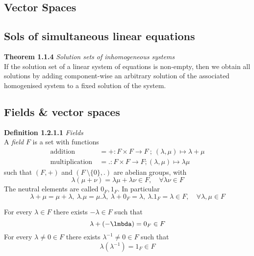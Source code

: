 \documentclass[8pt,landscape]{article}
\begin{document}
\begin{multicols}{3}

    \section{Vector Spaces}

    \subsection{Sols of simultaneous linear equations}

    \textbf{Theorem 1.1.4} \emph{Solution sets of inhomogeneous systems } \\
    If the solution set of a linear system of equations is non-empty,
    then we obtain all solutions by adding component-wise an arbitrary solution
    of the associated homogenised system to a fixed solution of the system.

    \subsection{Fields \& vector spaces}

    \item \textbf{Definition 1.2.1.1} \emph{Fields} \\
        A \emph{field} $F$ is a set with functions
        \begin{align*}{}
            \text{addition} \  &= + : F \times F \to F \ ;
            \ (\lambda, \mu) \mapsto \lambda + \mu \\
            \text{multiplication} \ &=. : F \times F \to F ; (\lambda, \mu)
            \mapsto \lambda\mu
        \end{align*}
        such that $(F, +)$ and $(F \ \setminus \{0\},.)$ are abelian groups, with
        \[
            \lambda (\mu + \nu) = \lambda \mu + \lambda \nu \in F, \quad
            \forall \lambda \nu \in F
        \]
        The neutral elements are called $0_F, 1_F$.
        In particular
        \[
            \lambda + \mu = \mu + \lambda ,\
            \lambda. \mu  = \mu. \lambda ,\
            \lambda + 0_F = \lambda ,\
            \lambda. 1_F  = \lambda \in F, \quad
            \forall \lambda, \mu \in F
        \]

        For every $\lambda \in F$ there exists $-\lambda \in F$ such that
        \[
            \lambda + (-\lmbda) = 0_F \in F
        \]
        For every $\lambda \neq 0 \in F$ there exists $\lambda^{-1} \neq 0 \in F$ such that
        \[
            \lambda(\lambda^{-1}) = 1_F \in F
        \]


\end{multicols}
\end{document}
